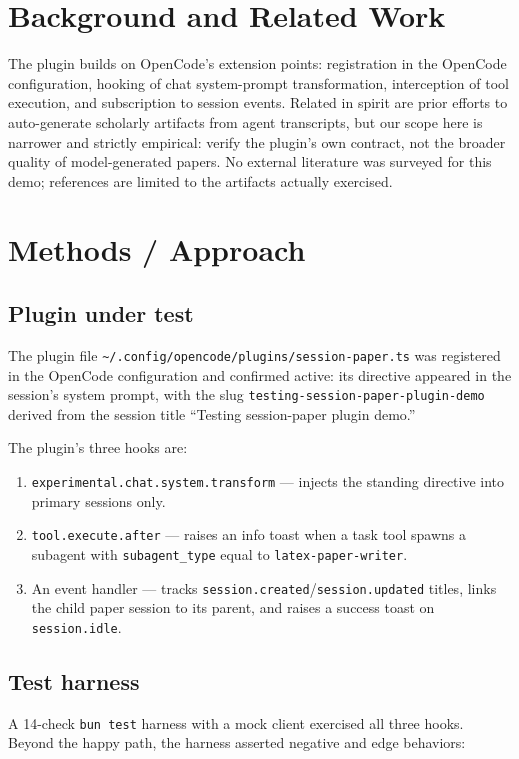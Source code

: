 \documentclass[11pt]{article}
\begin{document}
\section{Background and Related Work}
\label{sec:background}

The plugin builds on OpenCode's extension points: registration in the OpenCode
configuration, hooking of chat system-prompt transformation, interception of tool
execution, and subscription to session events. Related in spirit are prior efforts to
auto-generate scholarly artifacts from agent transcripts, but our scope here is narrower
and strictly empirical: verify the plugin's own contract, not the broader quality of
model-generated papers. No external literature was surveyed for this demo; references are
limited to the artifacts actually exercised.

\section{Methods / Approach}
\label{sec:methods}

\subsection{Plugin under test}
The plugin file \texttt{\textasciitilde/.config/opencode/plugins/session-paper.ts} was
registered in the OpenCode configuration and confirmed active: its directive appeared in
the session's system prompt, with the slug \texttt{testing-session-paper-plugin-demo}
derived from the session title ``Testing session-paper plugin demo.''

The plugin's three hooks are:

\begin{enumerate}
  \item \texttt{experimental.chat.system.transform} --- injects the standing directive
        into primary sessions only.
  \item \texttt{tool.execute.after} --- raises an info toast when a task tool spawns a
        subagent with \texttt{subagent\_type} equal to \texttt{latex-paper-writer}.
  \item An event handler --- tracks \texttt{session.created}/\texttt{session.updated}
        titles, links the child paper session to its parent, and raises a success toast on
        \texttt{session.idle}.
\end{enumerate}

\subsection{Test harness}
A 14-check \texttt{bun test} harness with a mock client exercised all three hooks. Beyond
the happy path, the harness asserted negative and edge behaviors:
\end{document}
